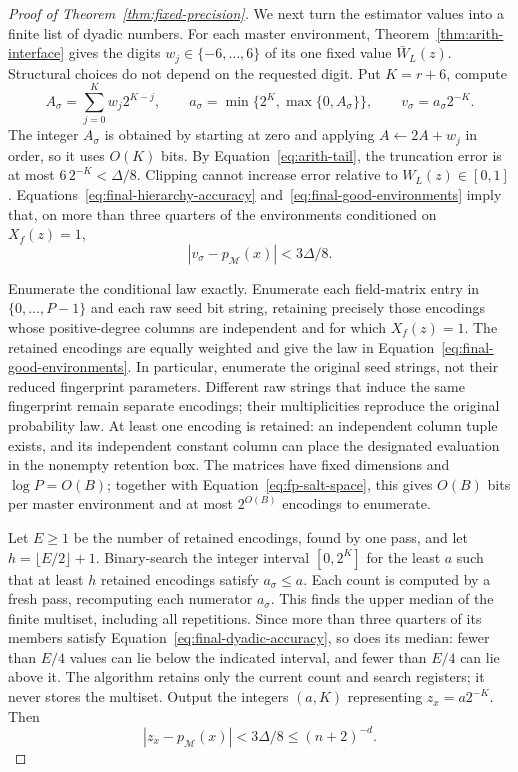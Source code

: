 \begin{proof}[Proof of Theorem~\ref{thm:fixed-precision}]
We next turn the estimator values into a finite list of dyadic numbers.
For each master environment, Theorem~\ref{thm:arith-interface}
gives the digits $w_j\in\{-6,\ldots,6\}$ of its one fixed value
$\bar W_L(z)$. Structural choices do not depend on the requested
digit. Put $K=r+6$, compute
\[
 A_\sigma=\sum_{j=0}^{K}w_j2^{K-j},\qquad
 a_\sigma=\min\{2^K,\max\{0,A_\sigma\}\},\qquad
 v_\sigma=a_\sigma2^{-K}.
\]
The integer $A_\sigma$ is obtained by starting at zero and applying
$A\leftarrow2A+w_j$ in order, so it uses $O(K)$ bits.
By Equation~\eqref{eq:arith-tail}, the truncation error is at most
$6\,2^{-K}<\Delta/8$. Clipping cannot increase error relative to
$W_L(z)\in[0,1]$. Equations~\eqref{eq:final-hierarchy-accuracy}
and~\eqref{eq:final-good-environments} imply that, on more than
three quarters of the environments conditioned on $X_f(z)=1$,
\begin{equation}\label{eq:final-dyadic-accuracy}
 |v_\sigma-p_{\mathcal M}(x)|<3\Delta/8.
\end{equation}

Enumerate the conditional law exactly. Enumerate each field-matrix
entry in $\{0,\ldots,P-1\}$ and each raw seed bit string, retaining
precisely those encodings whose positive-degree columns are independent
and for which $X_f(z)=1$. The retained encodings are equally weighted
and give the law in Equation~\eqref{eq:final-good-environments}.
In particular, enumerate the original seed strings, not their reduced
fingerprint parameters. Different raw strings that induce the same
fingerprint remain separate encodings; their multiplicities reproduce
the original probability law. At least one encoding is retained: an independent column tuple
exists, and its independent constant column can place the designated
evaluation in the nonempty retention box. The matrices have fixed
dimensions and $\log P=O(B)$; together with
Equation~\eqref{eq:fp-salt-space}, this gives $O(B)$ bits per master
environment and at most $2^{O(B)}$ encodings to enumerate.

Let $E\ge1$ be the number of retained encodings, found by one pass,
and let $h=\lfloor E/2\rfloor+1$. Binary-search the integer interval
$[0,2^K]$ for the least $a$ such that at least $h$ retained encodings
satisfy $a_\sigma\le a$. Each count is computed by a fresh pass,
recomputing each numerator $a_\sigma$. This finds the upper median
of the finite multiset, including all repetitions. Since more than
three quarters of its members satisfy
Equation~\eqref{eq:final-dyadic-accuracy}, so does its median: fewer than
$E/4$ values can lie below the indicated interval, and fewer than
$E/4$ can lie above it. The algorithm retains only the current count
and search registers; it never stores the multiset.
Output the integers $(a,K)$ representing $z_x=a2^{-K}$. Then
\[
 |z_x-p_{\mathcal M}(x)|<3\Delta/8
       \le(n+2)^{-d}.
\]


\end{proof}
